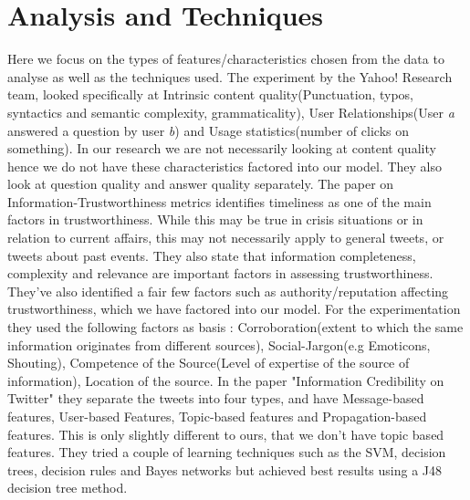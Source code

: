 \section{Analysis and Techniques}
Here we focus on the types of features/characteristics chosen from the data to analyse as well as the techniques used. The experiment by the Yahoo! Research team, looked specifically at Intrinsic content quality(Punctuation, typos, syntactics and semantic complexity, grammaticality), User Relationships(User \textit{a} answered a question by user \textit{b}) and Usage statistics(number of clicks on something). In our research we are not necessarily looking at content quality hence we do not have these characteristics factored into our model. They also look at question quality and answer quality separately. The paper on Information-Trustworthiness metrics identifies timeliness as one of the main factors in trustworthiness. While this may be true in crisis situations or in relation to current affairs, this may not necessarily apply to general tweets, or tweets about past events. They also state that information completeness, complexity and relevance are important factors in assessing trustworthiness. They've also identified a fair few factors such as authority/reputation affecting trustworthiness, which we have factored into our model. For the experimentation they used the following factors as basis : Corroboration(extent to which the same information originates from different sources), Social-Jargon(e.g Emoticons, Shouting), Competence of the Source(Level of expertise of the source of information), Location of the source. In the paper "Information Credibility on Twitter" they separate the tweets into four types, and have Message-based features, User-based Features, Topic-based features and Propagation-based features. This is only slightly different to ours, that we don't have topic based features. They tried a couple of learning techniques such as the SVM, decision trees, decision rules and Bayes networks but achieved best results using a J48 decision tree method. 
